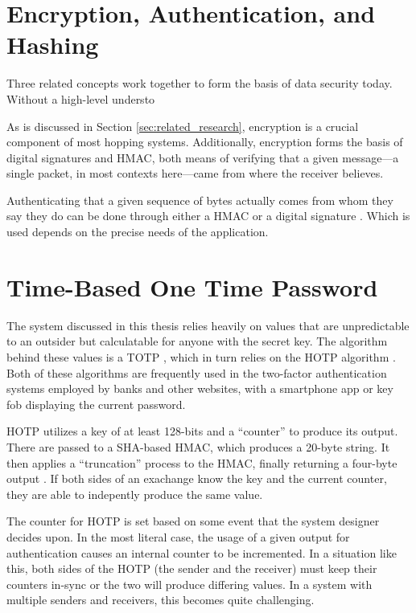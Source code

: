 \section{Encryption, Authentication, and Hashing}
\label{sec:encryption}
\par Three related concepts work together to form the basis of data security today. Without a high-level understo

As is discussed in Section \ref{sec:related_research}, encryption is a crucial component of most hopping systems. Additionally, encryption forms the basis of digital signatures and \ac{HMAC}, both means of verifying that a given message---a single packet, in most contexts here---came from where the receiver believes. 

\par Authenticating that a given sequence of bytes actually comes from whom they say they do can be done through either a \ac{HMAC} \cite{rfc2104} or a digital signature \cite{rfc3447}. Which is used depends on the precise needs of the application.

\par {}

\section{Time-Based One Time Password}
\label{sec:totp}
\par The system discussed in this thesis relies heavily on values that are unpredictable to an outsider but calculatable for anyone with the secret key. The algorithm behind these values is a \ac{TOTP} \cite{rfc6238}, which in turn relies on the \ac{HOTP} algorithm \cite{rfc4226}. Both of these algorithms are frequently used in the two-factor authentication systems employed by banks and other websites, with a smartphone app or key fob displaying the current password.

\par \ac{HOTP} utilizes a key of at least 128-bits and a ``counter'' to produce its output. There are passed to a \ac{SHA}-based \ac{HMAC}, which produces a 20-byte string. It then applies a ``truncation'' process to the \ac{HMAC}, finally returning a four-byte output \cite{rfc4226}. If both sides of an exachange know the key and the current counter, they are able to indepently produce the same value.

\par The counter for HOTP is set based on some event that the system designer decides upon. In the most literal case, the usage of a given output for authentication causes an internal counter to be incremented. In a situation like this, both sides of the HOTP (the sender and the receiver) must keep their counters in-sync or the two will produce differing values. In a system with multiple senders and receivers, this becomes quite challenging.


